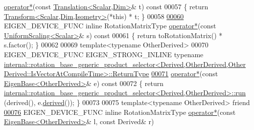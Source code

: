 \begin{DoxyCode}
      \hyperlink{class_eigen_1_1_rotation_base_a4b09a2174ee14f0aa71bc0285c9045a9}{operator*}(\textcolor{keyword}{const} \hyperlink{group___geometry___module_class_eigen_1_1_translation}{Translation<Scalar,Dim>}& t)\textcolor{keyword}{ const}
00057 \textcolor{keyword}{    }\{ \textcolor{keywordflow}{return} \hyperlink{group___geometry___module_class_eigen_1_1_transform}{Transform<Scalar,Dim,Isometry>}(*this) * t; \}
00058 
\hyperlink{class_eigen_1_1_rotation_base_ad7b31a12a4f8f2584b8937f958bd6ea6}{00060}     EIGEN\_DEVICE\_FUNC \textcolor{keyword}{inline} RotationMatrixType \hyperlink{class_eigen_1_1_rotation_base_ad7b31a12a4f8f2584b8937f958bd6ea6}{operator*}(\textcolor{keyword}{const} 
      \hyperlink{class_eigen_1_1_uniform_scaling}{UniformScaling<Scalar>}& s)\textcolor{keyword}{ const}
00061 \textcolor{keyword}{    }\{ \textcolor{keywordflow}{return} toRotationMatrix() * s.factor(); \}
00062 
00069     \textcolor{keyword}{template}<\textcolor{keyword}{typename} OtherDerived>
00070     EIGEN\_DEVICE\_FUNC EIGEN\_STRONG\_INLINE \textcolor{keyword}{typename} 
      \hyperlink{struct_eigen_1_1internal_1_1rotation__base__generic__product__selector}{
      internal::rotation\_base\_generic\_product\_selector<Derived,OtherDerived,OtherDerived::IsVectorAtCompileTime>::ReturnType}
\hyperlink{class_eigen_1_1_rotation_base_a68d8b53d31bcfa9fd6b0e24a061bea6c}{00071}     \hyperlink{class_eigen_1_1_rotation_base_a68d8b53d31bcfa9fd6b0e24a061bea6c}{operator*}(\textcolor{keyword}{const} \hyperlink{group___core___module_struct_eigen_1_1_eigen_base}{EigenBase<OtherDerived>}& e)\textcolor{keyword}{ const}
00072 \textcolor{keyword}{    }\{ \textcolor{keywordflow}{return} 
      \hyperlink{struct_eigen_1_1internal_1_1rotation__base__generic__product__selector}{internal::rotation\_base\_generic\_product\_selector<Derived,OtherDerived>::run}
      (derived(), e.\hyperlink{group___core___module_a324b16961a11d2ecfd2d1b7dd7946545}{derived}()); \}
00073 
00075     \textcolor{keyword}{template}<\textcolor{keyword}{typename} OtherDerived> \textcolor{keyword}{friend}
\hyperlink{class_eigen_1_1_rotation_base_affba3749838de939140b601e7db834e8}{00076}     EIGEN\_DEVICE\_FUNC \textcolor{keyword}{inline} RotationMatrixType \hyperlink{class_eigen_1_1_rotation_base_affba3749838de939140b601e7db834e8}{operator*}(\textcolor{keyword}{const} 
      \hyperlink{group___core___module_struct_eigen_1_1_eigen_base}{EigenBase<OtherDerived>}& l, \textcolor{keyword}{const} Derived& r)

\end{DoxyCode}

